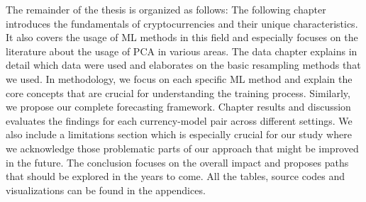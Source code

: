 The remainder of the thesis is organized as follows: 
The following chapter introduces the fundamentals of cryptocurrencies and their unique characteristics.
It also covers the usage of \ac{ML} methods in this field and especially focuses on the literature about
the usage of \ac{PCA} in various areas. The data chapter explains in detail which data were used 
and elaborates on the basic resampling methods that we used. In methodology, we focus on each specific
\ac{ML} method and explain the core concepts that are crucial for understanding the training process. 
Similarly, we propose our complete forecasting framework. Chapter results and discussion evaluates
the findings for each currency-model pair across different settings. We also include a limitations
section which is especially crucial for our study where we acknowledge those problematic parts of our approach 
that might be improved in the future. The conclusion focuses on the overall impact and proposes
paths that should be explored in the years to come. All the tables, source codes and visualizations
can be found in the appendices.
